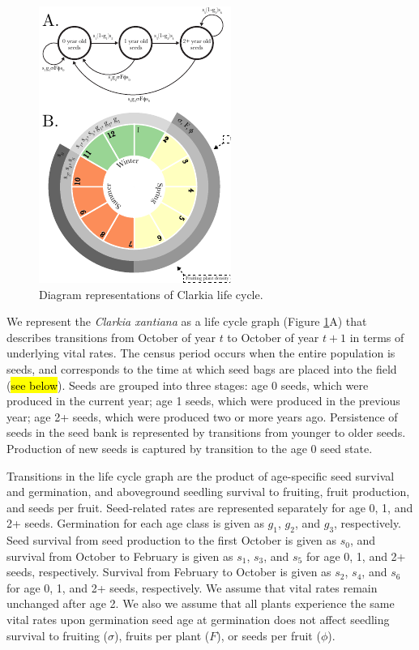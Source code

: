 \documentclass[12pt, oneside, titlepage]{article}   	%
\begin{document}
\begin{figure}
       \includegraphics[scale=1.9]{../manuscript/figures/model-figure.pdf}  
        \caption{ Diagram representations of Clarkia life cycle. }
        \label{fig:life-cycle}
\end{figure}

We represent the \textit{Clarkia xantiana} as a life cycle graph (Figure \ref{fig:life-cycle}A) that describes transitions from October of year $t$ to October of year $t+1$ in terms of underlying vital rates. The census period occurs when the entire population is seeds, and corresponds to the time at which seed bags are placed into the field (\hl{see below}). Seeds are grouped into three stages: age 0 seeds, which were produced in the current year; age 1 seeds, which were produced in the previous year; age 2+ seeds, which were produced two or more years ago. Persistence of seeds in the seed bank is represented by transitions from younger to older seeds. Production of new seeds is captured by transition to the age 0 seed state. 

Transitions in the life cycle graph are the product of age-specific seed survival and germination, and aboveground seedling survival to fruiting, fruit production, and seeds per fruit. Seed-related rates are represented separately for age 0, 1, and 2+ seeds. Germination for each age class is given as $g_1$, $g_2$, and $g_3$, respectively. Seed survival from seed production to the first October is given as $s_0$, and survival from October to February is given as $s_1$, $s_3$, and $s_5$ for age 0, 1, and 2+ seeds, respectively. Survival from February to October is given as $s_2$, $s_4$, and $s_6$ for age 0, 1, and 2+ seeds, respectively. We assume that vital rates remain unchanged after age 2. We also we assume that all plants experience the same vital rates upon germination seed age at germination does not affect seedling survival to fruiting ($\sigma$), fruits per plant ($F$), or seeds per fruit ($\phi$).
\end{document}
